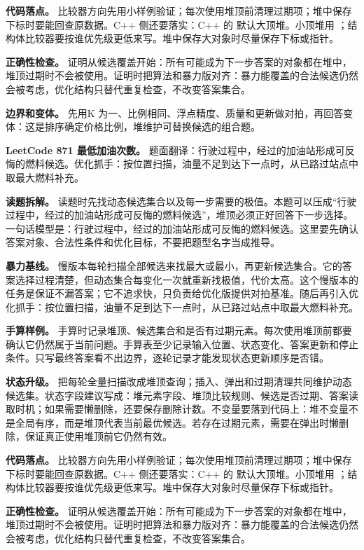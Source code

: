 \textbf{代码落点。} 比较器方向先用小样例验证；每次使用堆顶前清理过期项；堆中保存下标时要能回查原数据。C++ 侧还要落实：C++ 的  默认大顶堆。小顶堆用 ；结构体比较器要按谁优先级更低来写。堆中保存大对象时尽量保存下标或指针。

\textbf{正确性检查。} 证明从候选覆盖开始：所有可能成为下一步答案的对象都在堆中，堆顶过期时不会被使用。证明时把算法和暴力版对齐：暴力能覆盖的合法候选仍然会被考虑，优化结构只替代重复检查，不改变答案集合。

\textbf{边界和变体。} 先用K 为一、比例相同、浮点精度、质量和更新做对拍，再回答变体：这是排序确定价格比例，堆维护可替换候选的组合题。

\noindent\textbf{LeetCode 871 最低加油次数。} 题面翻译：行驶过程中，经过的加油站形成可反悔的燃料候选。优化抓手：按位置扫描，油量不足到达下一点时，从已路过站点中取最大燃料补充。

\textbf{读题拆解。} 读题时先找动态候选集合以及每一步需要的极值。本题可以压成“行驶过程中，经过的加油站形成可反悔的燃料候选”，堆顶必须正好回答下一步选择。一句话模型是：行驶过程中，经过的加油站形成可反悔的燃料候选。这里要先确认答案对象、合法性条件和优化目标，不要把题型名字当成推导。

\textbf{暴力基线。} 慢版本每轮扫描全部候选来找最大或最小，再更新候选集合。它的答案选择过程清楚，但动态集合每变化一次就重新找极值，代价太高。这个慢版本的任务是保证不漏答案；它不追求快，只负责给优化版提供对拍基准。随后再引入优化抓手：按位置扫描，油量不足到达下一点时，从已路过站点中取最大燃料补充。

\textbf{手算样例。} 手算时记录堆顶、候选集合和是否有过期元素。每次使用堆顶前都要确认它仍然属于当前问题。手算表至少记录输入位置、状态变化、答案更新和停止条件。只写最终答案看不出边界，逐轮记录才能发现状态更新顺序是否错。

\textbf{状态升级。} 把每轮全量扫描改成堆顶查询；插入、弹出和过期清理共同维护动态候选集。状态字段建议写成：堆元素字段、堆顶比较规则、候选是否过期、答案读取时机；如果需要懒删除，还要保存删除计数。不变量要落到代码上：堆不变量不是全局有序，而是堆顶代表当前最优候选。若存在过期元素，需要在弹出时懒删除，保证真正使用堆顶前它仍然有效。

\textbf{代码落点。} 比较器方向先用小样例验证；每次使用堆顶前清理过期项；堆中保存下标时要能回查原数据。C++ 侧还要落实：C++ 的  默认大顶堆。小顶堆用 ；结构体比较器要按谁优先级更低来写。堆中保存大对象时尽量保存下标或指针。

\textbf{正确性检查。} 证明从候选覆盖开始：所有可能成为下一步答案的对象都在堆中，堆顶过期时不会被使用。证明时把算法和暴力版对齐：暴力能覆盖的合法候选仍然会被考虑，优化结构只替代重复检查，不改变答案集合。

